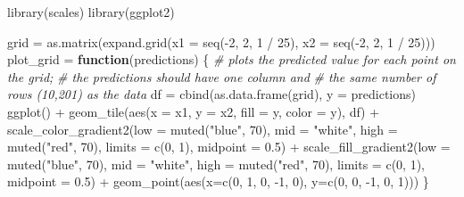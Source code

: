 \documentclass[
  a4paper,
]{article}
\newenvironment{Shaded}{\begin{snugshade}}{\end{snugshade}}
\newcommand{\AttributeTok}[1]{\textcolor[rgb]{0.77,0.63,0.00}{#1}}
\newcommand{\CommentTok}[1]{\textcolor[rgb]{0.56,0.35,0.01}{\textit{#1}}}
\newcommand{\ControlFlowTok}[1]{\textcolor[rgb]{0.13,0.29,0.53}{\textbf{#1}}}
\newcommand{\DecValTok}[1]{\textcolor[rgb]{0.00,0.00,0.81}{#1}}
\newcommand{\FloatTok}[1]{\textcolor[rgb]{0.00,0.00,0.81}{#1}}
\newcommand{\FunctionTok}[1]{\textcolor[rgb]{0.00,0.00,0.00}{#1}}
\newcommand{\NormalTok}[1]{#1}
\newcommand{\OtherTok}[1]{\textcolor[rgb]{0.56,0.35,0.01}{#1}}
\newcommand{\SpecialCharTok}[1]{\textcolor[rgb]{0.00,0.00,0.00}{#1}}
\newcommand{\StringTok}[1]{\textcolor[rgb]{0.31,0.60,0.02}{#1}}
\begin{document}
\begin{Shaded}
\begin{Highlighting}[]
\FunctionTok{library}\NormalTok{(scales)}
\FunctionTok{library}\NormalTok{(ggplot2)}

\NormalTok{grid }\OtherTok{=} \FunctionTok{as.matrix}\NormalTok{(}\FunctionTok{expand.grid}\NormalTok{(}\AttributeTok{x1 =} \FunctionTok{seq}\NormalTok{(}\SpecialCharTok{{-}}\DecValTok{2}\NormalTok{, }\DecValTok{2}\NormalTok{, }\DecValTok{1} \SpecialCharTok{/} \DecValTok{25}\NormalTok{), }\AttributeTok{x2 =} \FunctionTok{seq}\NormalTok{(}\SpecialCharTok{{-}}\DecValTok{2}\NormalTok{, }\DecValTok{2}\NormalTok{, }\DecValTok{1} \SpecialCharTok{/} \DecValTok{25}\NormalTok{)))}
\NormalTok{plot\_grid }\OtherTok{=} \ControlFlowTok{function}\NormalTok{(predictions) \{}
  \CommentTok{\# plots the predicted value for each point on the grid;}
  \CommentTok{\# the predictions should have one column and}
  \CommentTok{\# the same number of rows (10,201) as the data}
\NormalTok{  df }\OtherTok{=} \FunctionTok{cbind}\NormalTok{(}\FunctionTok{as.data.frame}\NormalTok{(grid), }\AttributeTok{y =}\NormalTok{ predictions)}
  \FunctionTok{ggplot}\NormalTok{() }\SpecialCharTok{+}
    \FunctionTok{geom\_tile}\NormalTok{(}\FunctionTok{aes}\NormalTok{(}\AttributeTok{x =}\NormalTok{ x1, }\AttributeTok{y =}\NormalTok{ x2, }\AttributeTok{fill =}\NormalTok{ y, }\AttributeTok{color =}\NormalTok{ y), df) }\SpecialCharTok{+}
    \FunctionTok{scale\_color\_gradient2}\NormalTok{(}\AttributeTok{low =} \FunctionTok{muted}\NormalTok{(}\StringTok{"blue"}\NormalTok{, }\DecValTok{70}\NormalTok{), }\AttributeTok{mid =} \StringTok{"white"}\NormalTok{,}
                         \AttributeTok{high =} \FunctionTok{muted}\NormalTok{(}\StringTok{"red"}\NormalTok{, }\DecValTok{70}\NormalTok{), }\AttributeTok{limits =} \FunctionTok{c}\NormalTok{(}\DecValTok{0}\NormalTok{, }\DecValTok{1}\NormalTok{),}
                         \AttributeTok{midpoint =} \FloatTok{0.5}\NormalTok{) }\SpecialCharTok{+}
    \FunctionTok{scale\_fill\_gradient2}\NormalTok{(}\AttributeTok{low =} \FunctionTok{muted}\NormalTok{(}\StringTok{"blue"}\NormalTok{, }\DecValTok{70}\NormalTok{), }\AttributeTok{mid =} \StringTok{"white"}\NormalTok{,}
                        \AttributeTok{high =} \FunctionTok{muted}\NormalTok{(}\StringTok{"red"}\NormalTok{, }\DecValTok{70}\NormalTok{), }\AttributeTok{limits =} \FunctionTok{c}\NormalTok{(}\DecValTok{0}\NormalTok{, }\DecValTok{1}\NormalTok{),}
                        \AttributeTok{midpoint =} \FloatTok{0.5}\NormalTok{) }\SpecialCharTok{+}
    \FunctionTok{geom\_point}\NormalTok{(}\FunctionTok{aes}\NormalTok{(}\AttributeTok{x=}\FunctionTok{c}\NormalTok{(}\DecValTok{0}\NormalTok{, }\DecValTok{1}\NormalTok{, }\DecValTok{0}\NormalTok{, }\SpecialCharTok{{-}}\DecValTok{1}\NormalTok{, }\DecValTok{0}\NormalTok{), }\AttributeTok{y=}\FunctionTok{c}\NormalTok{(}\DecValTok{0}\NormalTok{, }\DecValTok{0}\NormalTok{, }\SpecialCharTok{{-}}\DecValTok{1}\NormalTok{, }\DecValTok{0}\NormalTok{, }\DecValTok{1}\NormalTok{)))}
\NormalTok{\}}


\end{Highlighting}
\end{Shaded}
\end{document}
